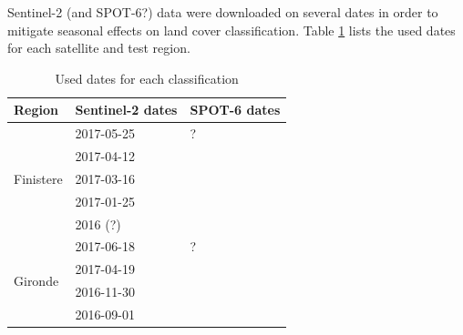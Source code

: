 \documentclass[10pt]{article}
\begin{document}
Sentinel-2 (and SPOT-6?) data were downloaded on several dates in order to mitigate seasonal effects on land cover classification. Table \ref{table:dates} lists the used dates for each satellite and test region.
\begin{table}[H]
\centering
\begin{tabular}{lll}\toprule
Region & Sentinel-2 dates & SPOT-6 dates \\\hline
\multirow{5}{*}{Finistere} & 2017-05-25 & ? \\
 & 2017-04-12 &  \\
 & 2017-03-16 &  \\
 & 2017-01-25 &  \\
 & 2016 (?) &  \\\hline
\multirow{4}{*}{Gironde} & 2017-06-18 & ? \\
 & 2017-04-19 &  \\
 & 2016-11-30 &  \\
 & 2016-09-01 &  \\\bottomrule
\end{tabular}
\caption{Used dates for each classification}
\label{table:dates}
\end{table}
\end{document}
